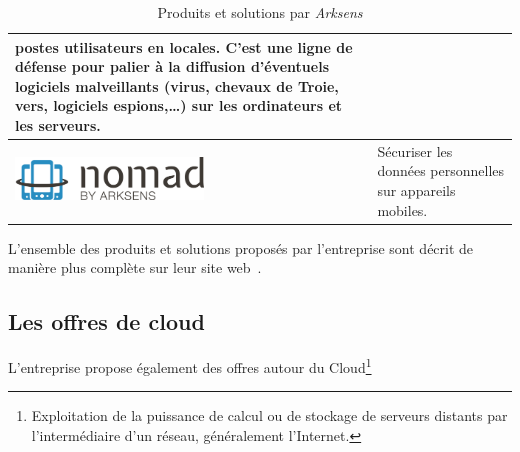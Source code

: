 \documentclass[a4paper,10pt, twoside]{report}
\begin{document}
\begin{spacing}{1.2}
\begin{table}[h!]
\begin{tabular}{m{6cm}m{6cm}}
    postes utilisateurs en locales. C'est une ligne de défense pour palier
    à la diffusion d'éventuels logiciels malveillants (virus, chevaux de
    Troie, vers, logiciels espions,\ldots{}) sur les ordinateurs et les
    serveurs.\\
    \hline
    \includegraphics[width=5cm, fbox]{produits/nomad.png} & Sécuriser les
    données personnelles sur appareils mobiles.\\
    \hline
  \end{tabular}
  \caption{\label{tabProduits} Produits et solutions par \textit{Arksens}}
\end{table}

L'ensemble des produits et solutions proposés par l'entreprise sont décrit
de manière plus complète sur leur site web~\cite{refArksens}.

\subsection{Les offres de cloud}
L'entreprise propose également des offres autour du Cloud\footnote{
Exploitation de la puissance de calcul ou de stockage de serveurs distants
par l'intermédiaire d'un réseau, généralement l'Internet.}


\end{spacing}
\end{document}
